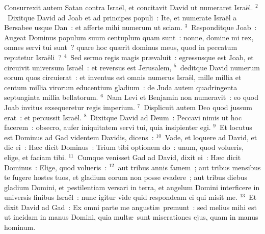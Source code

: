 \lettrine[lines=3,image=true,loversize=0.05,lraise=-0.03]{C}{}onsurrexit autem Satan contra Isra\"el, et concitavit David ut numeraret Isra\"el.
${}^{2}$~Dixitque David ad Joab et ad principes populi~: Ite, et numerate Isra\"el a Bersabee usque Dan~: et afferte mihi numerum ut sciam.
${}^{3}$~Responditque Joab~: Augeat Dominus populum suum centuplum quam sunt~: nonne, domine mi rex, omnes servi tui sunt~? quare hoc qu\ae rit dominus meus, quod in peccatum reputetur Isra\"eli~?
${}^{4}$~Sed sermo regis magis pr\ae valuit~: egressusque est Joab, et circuivit universum Isra\"el~: et reversus est Jerusalem,
${}^{5}$~deditque David numerum eorum quos circuierat~: et inventus est omnis numerus Isra\"el, mille millia et centum millia virorum educentium gladium~: de Juda autem quadringenta septuaginta millia bellatorum.
${}^{6}$~Nam Levi et Benjamin non numeravit~: eo quod Joab invitus exsequeretur regis imperium.
${}^{7}$~Displicuit autem Deo quod jussum erat~: et percussit Isra\"el.
${}^{8}$~Dixitque David ad Deum~: Peccavi nimis ut hoc facerem~: obsecro, aufer iniquitatem servi tui, quia insipienter egi.
${}^{9}$~Et locutus est Dominus ad Gad videntem Davidis, dicens~:
${}^{10}$~Vade, et loquere ad David, et dic ei~: H\ae c dicit Dominus~: Trium tibi optionem do~: unum, quod volueris, elige, et faciam tibi.
${}^{11}$~Cumque venisset Gad ad David, dixit ei~: H\ae c dicit Dominus~: Elige, quod volueris~:
${}^{12}$~aut tribus annis famem~; aut tribus mensibus te fugere hostes tuos, et gladium eorum non posse evadere~; aut tribus diebus gladium Domini, et pestilentiam versari in terra, et angelum Domini interficere in universis finibus Isra\"el~: nunc igitur vide quid respondeam ei qui misit me.
${}^{13}$~Et dixit David ad Gad~: Ex omni parte me angusti\ae\ premunt~: sed melius mihi est ut incidam in manus Domini, quia mult\ae\ sunt miserationes ejus, quam in manus hominum.


